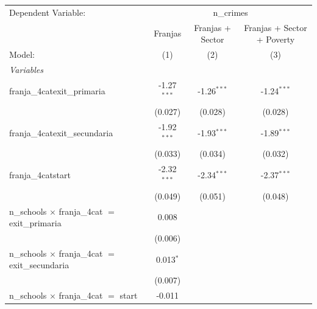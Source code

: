 
\begingroup
\centering
\begin{tabular}{lccc}
   \tabularnewline \midrule \midrule
   Dependent Variable: & \multicolumn{3}{c}{n\_crimes}\\
                                                                                               & Franjas        & Franjas + Sector      & Franjas + Sector + Poverty \\   
   Model:                                                                                      & (1)            & (2)                   & (3)\\  
   \midrule
   \emph{Variables}\\
   franja\_4catexit\_primaria                                                                  & -1.27$^{***}$  & -1.26$^{***}$         & -1.24$^{***}$\\   
                                                                                               & (0.027)        & (0.028)               & (0.028)\\   
   franja\_4catexit\_secundaria                                                                & -1.92$^{***}$  & -1.93$^{***}$         & -1.89$^{***}$\\   
                                                                                               & (0.033)        & (0.034)               & (0.032)\\   
   franja\_4catstart                                                                           & -2.32$^{***}$  & -2.34$^{***}$         & -2.37$^{***}$\\   
                                                                                               & (0.049)        & (0.051)               & (0.048)\\   
   n\_schools $\times$ franja\_4cat $=$ exit\_primaria                                         & 0.008          &                       &   \\   
                                                                                               & (0.006)        &                       &   \\   
   n\_schools $\times$ franja\_4cat $=$ exit\_secundaria                                       & 0.013$^{*}$    &                       &   \\   
                                                                                               & (0.007)        &                       &   \\   
   n\_schools $\times$ franja\_4cat $=$ start                                                  & -0.011         &                       &   \\   

\end{tabular}
